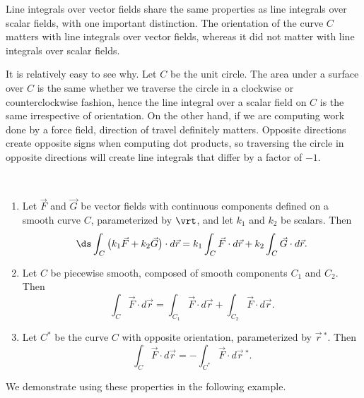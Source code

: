 Line integrals over vector fields share the same properties as line integrals over scalar fields, with one important distinction. The orientation of the curve $C$ matters with line integrals over vector fields, whereas it did not matter with line integrals over scalar fields.

It is relatively easy to see why. Let $C$ be the unit circle. The area under a surface over $C$ is the same whether we traverse the circle in a clockwise or counterclockwise fashion, hence the line integral over a scalar field on $C$ is the same irrespective of orientation. On the other hand, if we are computing work done by a force field, direction of travel definitely matters. Opposite directions create opposite signs when computing dot products, so traversing the circle in opposite directions will create line integrals that differ by a factor of $-1$. 

\begin{theorem}\label{thm:line_int_properties_vector}
\mbox{}\\[-2\baselineskip]
\begin{enumerate}
	\item	Let $\vec F$ and $\vec G$ be  vector fields with continuous components defined on a smooth curve $C$, parameterized by $\vrt$, and let $k_1$ and $k_2$ be scalars. Then
	\[
	\ds \int_C\big(k_1\vec F+k_2\vec G\big)\cdot d\vec r
	= k_1\int_C\vec F\cdot d\vec r +k_2\int_C\vec G\cdot d\vec r.
	\]
	\item Let $C$ be piecewise smooth, composed of smooth components $C_1$ and $C_2$. Then
	\[
	\int_C\vec F\cdot d\vec r
	= \int_{C_1}\vec F\cdot d\vec r + \int_{C_2}\vec F\cdot d\vec r.
	\]
	\item	Let $C^*$ be the curve $C$ with opposite orientation, parameterized by $\vec r\,^*$. Then
	\[\int_C\vec F\cdot d\vec r = -\int_{C^*}\vec F\cdot d\vec r\,^*.\]
	\end{enumerate}
\end{theorem}

We demonstrate using these properties in the following example.

